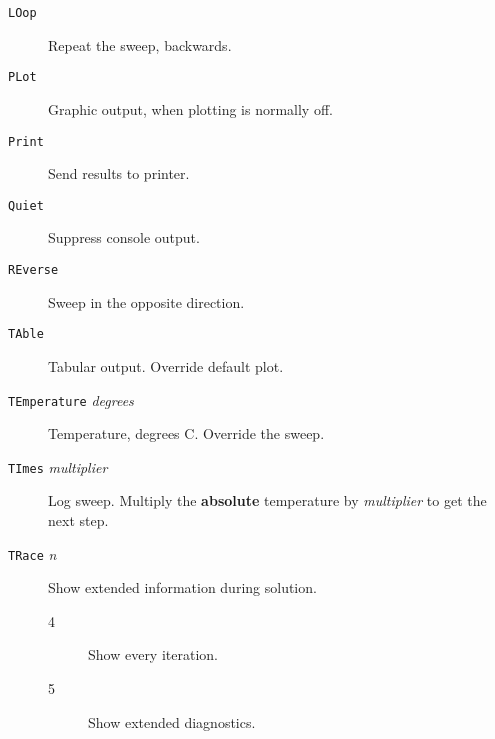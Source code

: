 \begin{description}
\item[{\tt LOop}] Repeat the sweep, backwards.




\item[{\tt PLot}] Graphic output, when plotting is
normally off.

\item[{\tt Print}] Send results to printer.

\item[{\tt Quiet}] Suppress console output.


\item[{\tt REverse}] Sweep in the opposite direction.

\item[{\tt TAble}] Tabular output. Override default plot.

\item[{\tt TEmperature} {\it degrees}] Temperature,
degrees C.  Override the sweep.

\item[{\tt TImes} {\it multiplier}] Log sweep.  Multiply
the {\bf absolute} temperature by {\it multiplier} to get
the next step.

\item[{\tt TRace} {\it n}] Show extended information during solution.
\begin{description}
\item[4] Show every iteration.
\item[5] Show extended diagnostics.
\end{description}


\end{description}
